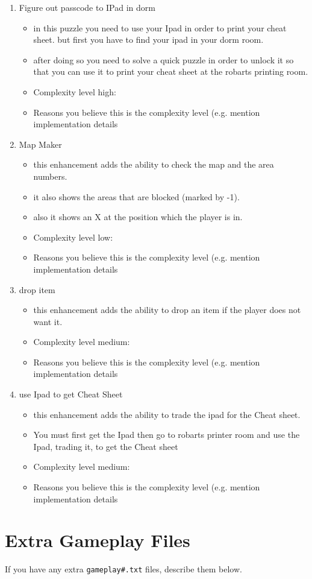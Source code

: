 \documentclass[11pt]{article}
\begin{document}
\begin{enumerate}
\item Figure out passcode to IPad in dorm
	\begin{itemize}
	\item in this puzzle you need to use your Ipad in order to print your cheat sheet. but first you have to find your ipad in your dorm room.
	\item after doing so you need to solve a quick puzzle in order to unlock it so that you can use it to print your cheat sheet at the robarts printing room.
	\item Complexity level high:
	\item Reasons you believe this is the complexity level (e.g. mention implementation details
	\end{itemize}


\item Map Maker
	\begin{itemize}
	\item this enhancement adds the ability to check the map and the area numbers.
	\item it also shows the areas that are blocked (marked by -1).
	\item also it shows an X at the position which the player is in.
	\item Complexity level low:
	\item Reasons you believe this is the complexity level (e.g. mention implementation details
	\end{itemize}

\item drop item
	\begin{itemize}
	\item this enhancement adds the ability to drop an item if the player does not want it.
	\item Complexity level medium:
	\item Reasons you believe this is the complexity level (e.g. mention implementation details
	\end{itemize}

\item use Ipad to get Cheat Sheet
	\begin{itemize}
	\item this enhancement adds the ability to trade the ipad for the Cheat sheet.
	\item You must first get the Ipad then go to robarts printer room and use the Ipad, trading it, to get the Cheat sheet
	\item Complexity level medium:
	\item Reasons you believe this is the complexity level (e.g. mention implementation details
	\end{itemize}


\end{enumerate}


\section*{Extra Gameplay Files}

If you have any extra \texttt{gameplay\#.txt} files, describe them below.
\end{document}
